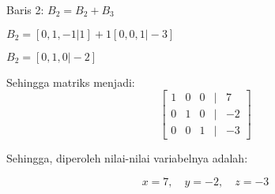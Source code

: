 \documentclass{article}
\begin{document}
\begin{enumerate}
    Baris 2: \(B_2 = B_2 + B_3\)

    \(B_2 = [0, 1, -1 \vert 1] + 1[0, 0, 1 \vert -3]\)

    \(B_2 = [0, 1, 0 \vert -2]\)

    \vspace{1em}

    Sehingga matriks menjadi:
    \[
    \begin{bmatrix}
    1 & 0 & 0 & \vert & 7 \\
    0 & 1 & 0 & \vert & -2 \\
    0 & 0 & 1 & \vert & -3
    \end{bmatrix}
    \]

\end{enumerate}

Sehingga, diperoleh nilai-nilai variabelnya adalah:

\[
x = 7, \quad y = -2, \quad z = -3
\]
\end{document}
